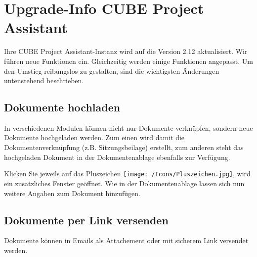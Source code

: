 \section{Upgrade-Info CUBE Project Assistant} %

Ihre CUBE Project Assistant-Instanz wird auf die Version 2.12 aktualisiert. Wir führen neue Funktionen ein. Gleichzeitig werden einige Funktionen angepasst. Um den Umstieg reibungslos zu gestalten, sind die wichtigsten Änderungen untenstehend beschrieben.

\subsection{Dokumente hochladen}
In verschiedenen Modulen können nicht nur Dokumente verknüpfen, sondern neue Dokumente hochgeladen werden. Zum einen wird damit die Dokumentenverknüpfung (z.B. Sitzungsbeilage) erstellt, zum anderen steht das hochgeladen Dokument in der Dokumentenablage ebenfalls zur Verfügung.

\begin{figure}[H]
\end{figure}

Klicken Sie jeweils auf das Pluszeichen \texttt{[image: /Icons/Pluszeichen.jpg]}, wird ein zusätzliches Fenster geöffnet. Wie in der Dokumentenablage lassen sich nun weitere Angaben zum Dokument hinzufügen.

\subsection{Dokumente per Link versenden}
Dokumente können in Emails als Attachement oder mit sicherem Link versendet werden.

